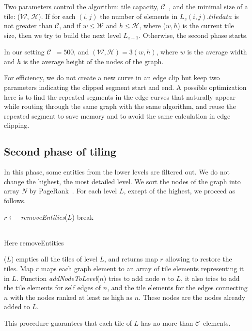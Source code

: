 \documentclass{gd-llncs}
\newcommand{\capac}{$\mathcal{C}$}
\newcommand{\mw}{$\mathcal{W}$}
\newcommand{\mh}{$\mathcal{H}$}
\begin{document}
{Two parameters control the algorithm: tile capacity, \capac~, and the minimal size of a tile: (\mw, \mh).
If for each $(i,j)$ the number of elements in $L_z(i,j).\textit{tiledata}$ is not greater than \capac, and if $w \leq \mathcal{W}$ and $h \leq \mathcal{H}$, where ($w,h$) is the current tile size, then we try to build the next level  $L_{z+1}$. Otherwise, the second phase starts.

In our setting \capac~$=500$, and $(\mathcal{W},\mathcal{H}) = 3(w,h)$, where $w$ is the average width and $h$ is the average height of the nodes of the graph.

For efficiency, we do not create a new curve in an edge clip but keep two parameters indicating the clipped segment start and end.
A possible optimization here is to find the repeated segments in the edge curves that naturally appear
while routing through the same graph with the same algorithm, and reuse the repeated segment to save memory and to avoid the same calculation in edge clipping.

\subsection*{Second phase of tiling}
In this phase, some entities from the lower levels are filtered out. We do not change the highest, the most detailed level.
We sort the nodes of the graph into array $N$ by PageRank~\cite{page1999pagerank}. For each level $L$, except of the highest, we proceed as follows.
\begin{algorithm}
  \begin{algorithmic}[1]
    \State $r \gets$~\textit{removeEntities}($L$)
    {break}
    \EndIf
    \EndFor
    \EndProcedure
  \end{algorithmic}
\end{algorithm}\\
Here removeEntities}($L$) empties all the tiles of level $L$, and returns map $r$ allowing to restore the tiles.
Map $r$ maps each graph element to an array of tile elements representing it in $L$. Function \textit{addNodeToLevel}($n$) tries to add node $n$ to $L$, it also tries to add the tile elements for self edges of $n$, and the tile elements for the edges connecting $n$ with the nodes ranked at least as high as $n$. These nodes are the nodes already added to $L$.

This procedure guarantees that each tile of $L$ has no more than \capac~elements.
\end{document}
